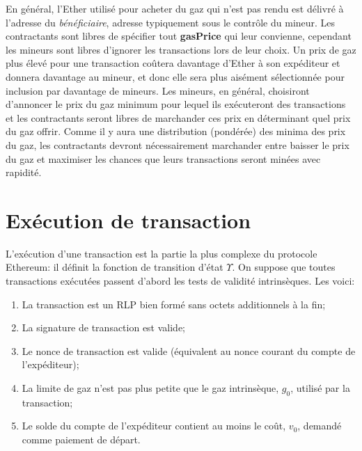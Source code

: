 \documentclass[9pt,oneside]{amsart}
\begin{document}
\begin{multicols}{2}
En général, l'Ether utilisé pour acheter du gaz qui n'est pas rendu est délivré à l'adresse du \textit{bénéficiaire}, adresse typiquement sous le contrôle du mineur. Les contractants sont libres de spécifier tout \textbf{gasPrice} qui leur convienne, cependant les mineurs sont libres d'ignorer les transactions lors de leur choix. Un prix de gaz plus élevé pour une transaction coûtera davantage d'Ether à son expéditeur et donnera davantage au mineur, et donc elle sera plus aisément sélectionnée pour inclusion par davantage de mineurs. Les mineurs, en général, choisiront d'annoncer le prix du gaz minimum pour lequel ils exécuteront des transactions et les contractants seront libres de marchander ces prix en déterminant quel prix du gaz offrir. Comme il y aura une distribution (pondérée) des minima des prix du gaz, les contractants devront nécessairement marchander entre baisser le prix du gaz et maximiser les chances que leurs transactions seront minées avec rapidité.


\section{Exécution de transaction} \label{ch:transactions}

L'exécution d'une transaction est la partie la plus complexe du protocole Ethereum: il définit la fonction de transition d'état $\Upsilon$. On suppose que toutes transactions exécutées passent d'abord les tests de validité intrinsèques. Les voici:

\begin{enumerate}
\item La transaction est un RLP bien formé sans octets additionnels à la fin;
\item La signature de transaction est valide;
\item Le nonce de transaction est valide (équivalent au nonce courant du compte de l'expéditeur);
\item La limite de gaz n'est pas plus petite que le gaz intrinsèque, $g_0$, utilisé par la transaction;
\item Le solde du compte de l'expéditeur contient au moins le coût, $v_0$, demandé comme paiement de départ.
\end{enumerate}


\end{multicols}
\end{document}
